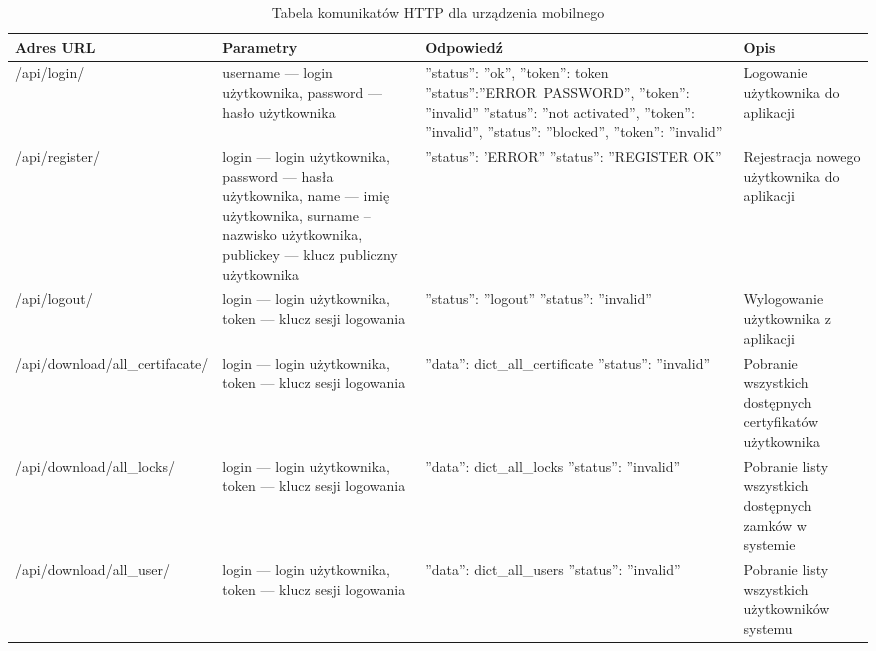 \begin{landscape}
	\begin{longtable}[!ht]{|m{5cm}|m{6.5cm}|m{5cm}|m{5.5cm}|} 
		\caption{Tabela komunikatów HTTP dla urządzenia mobilnego}
		\label{tab:http_mobilne}\\
		\hline	
		Adres URL & Parametry & Odpowiedź & Opis \\	\hline
		/api/login/ & username --- login użytkownika, \newline password --- hasło użytkownika & ''status'': ''ok'', ''token'': token \tablinia ''status'':''ERROR~\mbox{PASSWORD}'', ''token'': ''invalid'' \tablinia ''status'': ''not activated'', \newline ''token'': ''invalid'', \tablinia ''status'': ''blocked'', \newline''token'': ''invalid'' & Logowanie użytkownika do aplikacji \\ \hline
		/api/register/ & login --- login użytkownika, \newline password --- hasła użytkownika, \newline name --- imię użytkownika, \newline surname -- nazwisko użytkownika, \newline publickey --- klucz publiczny użytkownika & ''status'': 'ERROR'' \tablinia ''status'': ''REGISTER OK'' & Rejestracja nowego użytkownika do aplikacji \\ \hline
		/api/logout/ & login --- login użytkownika, \newline token --- klucz sesji logowania & ''status'': ''logout'' \tablinia ''status'': ''invalid'' & Wylogowanie użytkownika z aplikacji \\ \hline
		/api/download/all\_certifacate/ & login --- login użytkownika, \newline token --- klucz sesji logowania & ''data'': dict\_all\_certificate \tablinia ''status'': ''invalid'' & Pobranie wszystkich dostępnych certyfikatów użytkownika \\ \hline
		/api/download/all\_locks/ & login --- login użytkownika, \newline token --- klucz sesji logowania & ''data'': dict\_all\_locks \tablinia ''status'': ''invalid'' & Pobranie listy wszystkich dostępnych zamków w systemie \\ \hline
		/api/download/all\_user/ & login --- login użytkownika, \newline token --- klucz sesji logowania & ''data'': dict\_all\_users \tablinia ''status'': ''invalid'' & Pobranie listy wszystkich użytkowników systemu \\ \hline

\end{longtable}
\end{landscape}
